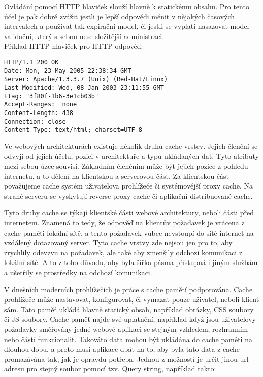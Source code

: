 \documentclass[12pt]{article}
\begin{document}
Ovládání pomocí HTTP hlaviček slouží hlavně k statickému obsahu. Pro tento účel je pak dobré zvážit jestli je lepší odpovědi měnit v nějakých časových intervalech a používat tak expirační model, či jestli se vyplatí nasazovat model validační, který s sebou nese složitější administraci.\\
\clearpage
Příklad HTTP hlaviček pro HTTP odpověď:
\begin{scriptsize}
\begin{verbatim}
HTTP/1.1 200 OK
Date: Mon, 23 May 2005 22:38:34 GMT
Server: Apache/1.3.3.7 (Unix) (Red-Hat/Linux)
Last-Modified: Wed, 08 Jan 2003 23:11:55 GMT
Etag: "3f80f-1b6-3e1cb03b"
Accept-Ranges:  none
Content-Length: 438
Connection: close
Content-Type: text/html; charset=UTF-8
\end{verbatim}
\end{scriptsize}

Ve webových architekturách existuje několik druhů cache vrstev. Jejich členění se odvyjí od jejich účelu, pozici v architektuře a typu ukládaných dat. Tyto atributy mezi sebou úzce souvisí. Základním členěním může být jejich pozice z pohledu internetu, a to dělení na klientskou a serverovou část. Za klientskou část považujeme cache systém uživatelova prohlížeče či systémovější proxy cache. Na straně serveru se vyskytují reverse proxy cache či aplikační distribuované cache.

\obrazek
{}

Tyto druhy cache se týkají klientské části webové architektury, neboli části před internetem. Znamená to tedy, že odpověď na klientův požadavek je vrácena z cache paměti lokální sítě, a tento požadavek vůbec nevstoupí do sítě internet na vzdálený dotazovaný server. Tyto cache vrstvy zde nejsou jen pro to, aby zrychlily odevzvu na požadavek, ale také aby zmenšily odchozí komunikaci z lokální sítě. A to z toho důvodu, aby byla šířka pásma přístupná i jiným službám a ušetřily se prostředky na odchozí komunikaci.

V dnešních moderních prohlížečích je práce s cache pamětí podporována. Cache prohlížeče může nastavovat, konfigurovat, či vymazat pouze uživatel, neboli klient sám. Tato paměť ukládá hlavně statický obsah, například obrázky, CSS soubory či JS soubory. Cache paměť najde své uplatnění, například když jsou uživatelovy požadavky směřovány jedné webové aplikaci se stejným vzhledem, rozhranním nebo částí funkcionalit. Takováto data mohou být ukládána do cache paměti na dlouhou dobu, a proto musí aplikace dbát na to, aby byla tato data z cache promazávána tak, jak je opravdu potřeba. Jednou z možností je určit jinou url adresu pro stejný soubor pomocí tzv. Query string, například takto:
\end{document}
